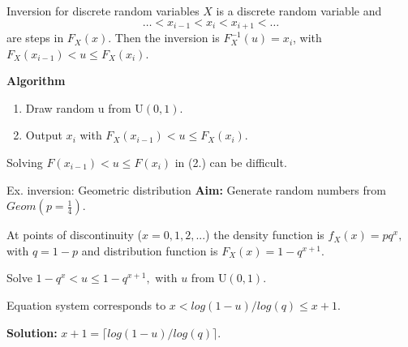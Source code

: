 
\begin{vbframe}{Inversion for discrete random variables}
$X$ is a discrete random variable and
$$
\ldots < x_{i-1} < x_i < x_{i+1} < \ldots
$$
are steps in $F_X(x)$.
Then the inversion is $F_X^{-1}(u)=x_i$, with $F_X(x_{i-1}) < u \leq F_X(x_i)$.

\lz

\textbf{Algorithm}
\begin{enumerate}
\item Draw random u from $\text{U}(0, 1)$.
\item Output $x_i$ with $F_X(x_{i-1}) < u \leq F_X(x_i)$.

\end{enumerate}

\lz

Solving $F(x_{i-1}) < u \leq F(x_i)$ in (2.) can be difficult.
\end{vbframe}

\begin{vbframe}{Ex. inversion: Geometric distribution}
\textbf{Aim:} Generate random numbers from $Geom(p=\frac{1}{4})$.

\lz

At points of discontinuity ($x=0,1,2,...$) the density function is $f_X(x)=pq^x,$ with $q=1-p$ and distribution function is $F_X(x)=1-q^{x+1}$.

\lz

Solve $1-q^{x} < u \leq 1-q^{x+1},$ with $u$ from $\text{U}(0, 1)$.

\lz

Equation system corresponds to $x < log(1-u)/log(q) \leq x+1$.

\lz

\textbf{Solution:} $x+1 = \lceil log(1-u)/log(q) \rceil$.





\end{vbframe}

